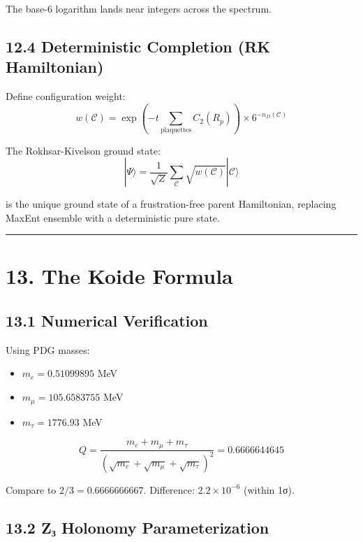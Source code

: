 The base-6 logarithm lands near integers across the spectrum.

\subsection{12.4 Deterministic Completion (RK Hamiltonian)}\label{124-deterministic-completion-rk-hamiltonian}

Define configuration weight: \[w(\mathcal{C}) = \exp\left(-t \sum_{\text{plaquettes}} C_2(R_p)\right) \times 6^{-n_D(\mathcal{C})}\]

The Rokhsar-Kivelson ground state: \[|\Psi\rangle = \frac{1}{\sqrt{Z}} \sum_{\mathcal{C}} \sqrt{w(\mathcal{C})} |\mathcal{C}\rangle\]

is the unique ground state of a frustration-free parent Hamiltonian, replacing MaxEnt ensemble with a deterministic pure state.

\begin{center}\rule{0.5\linewidth}{0.5pt}\end{center}

\section{13. The Koide Formula}\label{13-the-koide-formula}

\subsection{13.1 Numerical Verification}\label{131-numerical-verification}

Using PDG masses:

\begin{itemize}
\tightlist
\item
  \(m_e = 0.51099895\) MeV
\item
  \(m_\mu = 105.6583755\) MeV
\item
  \(m_\tau = 1776.93\) MeV
\end{itemize}

\[Q = \frac{m_e + m_\mu + m_\tau}{(\sqrt{m_e} + \sqrt{m_\mu} + \sqrt{m_\tau})^2} = 0.6666644645\]

Compare to \(2/3 = 0.6666666667\). Difference: \(2.2 \times 10^{-6}\) (within 1σ).

\subsection{13.2 Z₃ Holonomy Parameterization}\label{132-zux2083-holonomy-parameterization}

